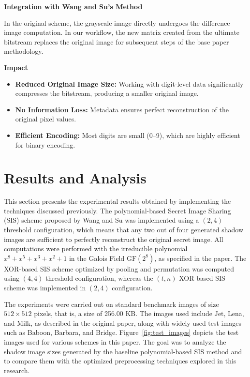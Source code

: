 \textbf{Integration with Wang and Su's Method}
 
In the original scheme, the grayscale image directly undergoes the difference image computation. In our workflow, the new matrix created from the ultimate bitstream replaces the original image for subsequent steps of the base paper methodology.
 
\textbf{Impact}
\begin{itemize}
    \item \textbf{Reduced Original Image Size:} Working with digit-level data significantly compresses the bitstream, producing a smaller original image.
    \item \textbf{No Information Loss:} Metadata ensures perfect reconstruction of the original pixel values.
    \item \textbf{Efficient Encoding:} Most digits are small (0--9), which are highly efficient for binary encoding.
\end{itemize}

\section{Results and Analysis}
 
This section presents the experimental results obtained by implementing the techniques discussed previously. The polynomial-based Secret Image Sharing (SIS) scheme proposed by Wang and Su was implemented using a $(2, 4)$ threshold configuration, which means that any two out of four generated shadow images are sufficient to perfectly reconstruct the original secret image. All computations were performed with the irreducible polynomial $x^8 + x^5 + x^3 + x^2 + 1$ in the Galois Field $\mathrm{GF}(2^8)$, as specified in the paper. The XOR-based SIS scheme optimized by pooling and permutation was computed using $(4, 4)$ threshold configuration, whereas the $(t, n)$ XOR-based SIS scheme was implemented in $(2, 4)$ configuration.
 
The experiments were carried out on standard benchmark images of size $512 \times 512$ pixels, that is, a size of 256.00 KB. The images used include Jet, Lena, and Milk, as described in the original paper, along with widely used test images such as Baboon, Barbara, and Bridge. Figure~\ref{fig:test_images} depicts the test images used for various schemes in this paper. The goal was to analyze the shadow image sizes generated by the baseline polynomial-based SIS method and to compare them with the optimized preprocessing techniques explored in this research.
 
